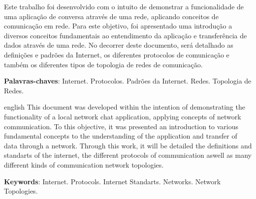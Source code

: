 
\imprimirfolhaderosto


 \begin{resumo}
    \text Este trabalho foi desenvolvido com o intuito de demonstrar a funcionalidade de uma aplicação de conversa através de uma rede, aplicando conceitos de comunicação em rede. Para este objetivo, foi apresentado uma introdução a diversos conceitos fundamentais ao entendimento da aplicação e transferência de dados através de uma rede.
    \text No decorrer deste documento, será detalhado as definições e padrões da Internet, os diferentes protocolos de comunicação e também os diferentes tipos de topologia de redes de comunicação.
 	\vspace{\onelineskip}
 
 	\noindent 
 	\textbf{Palavras-chaves}: Internet. Protocolos. Padrões da Internet. Redes. Topologia de Redes.
 \end{resumo}

 \begin{resumo}[Abstract]
 \begin{otherlanguage*}{english}
    \text This document was developed within the intention of demonstrating the functionality of a local network chat application, applying concepts of network communication. To this objective, it was presented an introduction to various fundamental concepts to the understanding of the application and transfer of data through a network.
    \text Through this work, it will be detailed the definitions and standarts of the internet, the different protocols of communication aswell as many different kinds of communication network topologies.
 	\vspace{\onelineskip}
 
 	\noindent 
 	\textbf{Keywords}: Internet. Protocols. Internet Standarts. Networks. Network Topologies.
 \end{otherlanguage*}
 \end{resumo}

